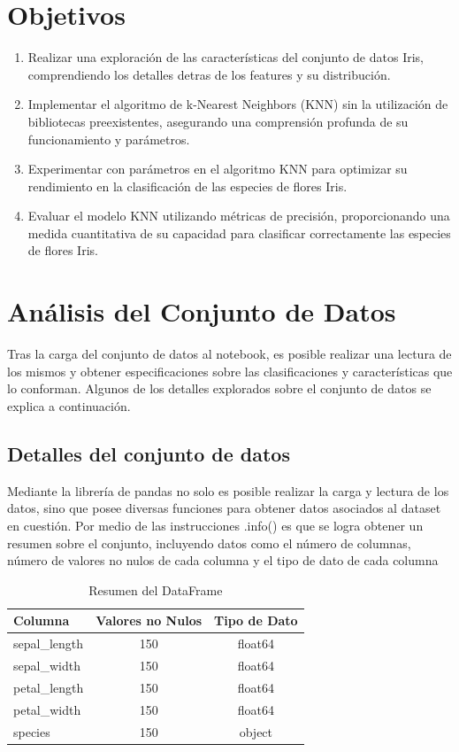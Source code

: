 \documentclass[conference]{IEEEtran}
\begin{document}
\section{Objetivos}
\begin{enumerate}

    \item Realizar una exploración de las características del conjunto de datos Iris, comprendiendo los detalles detras de los features y su distribución.
    
    \item Implementar el algoritmo de k-Nearest Neighbors (KNN) sin la utilización de bibliotecas preexistentes, asegurando una comprensión profunda de su funcionamiento y parámetros.
    
    \item Experimentar con parámetros en el algoritmo KNN para optimizar su rendimiento en la clasificación de las especies de flores Iris.
    
    \item Evaluar el modelo KNN utilizando métricas de precisión, proporcionando una medida cuantitativa de su capacidad para clasificar correctamente las especies de flores Iris.

\end{enumerate}

\section{Análisis del Conjunto de Datos}
Tras la carga del conjunto de datos al notebook, es posible realizar una lectura de los mismos y obtener especificaciones sobre las clasificaciones y características que lo conforman. Algunos de los detalles explorados sobre el conjunto de datos se explica a continuación.

\subsection{Detalles del conjunto de datos}
Mediante la librería de pandas no solo es posible realizar la carga y lectura de los datos, sino que posee diversas funciones para obtener datos asociados al dataset en cuestión. Por medio de las instrucciones .info() es que se logra obtener un resumen sobre el conjunto, incluyendo datos como el número de columnas, número de valores no nulos de cada columna y el tipo de dato de cada columna

\begin{table}[h]
\centering
\caption{Resumen del DataFrame}
\label{tab:resumen_dataframe}
\begin{tabular}{|l|c|c|}
\hline
\textbf{Columna} & \textbf{Valores no Nulos} & \textbf{Tipo de Dato} \\ \hline
sepal\_length & 150 & float64 \\
sepal\_width & 150 & float64 \\
petal\_length & 150 & float64 \\
petal\_width & 150 & float64 \\
species & 150 & object \\ \hline
\end{tabular}
\end{table}
\end{document}
